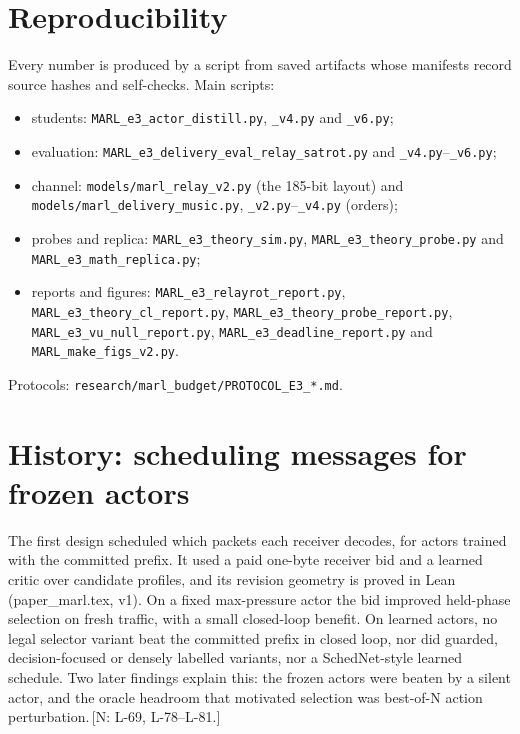 \documentclass[11pt]{article}
\theoremstyle{definition}
\newif\ifshownotes\shownotestrue
\newcommand{\NOTE}[1]{\ifshownotes{\color{notecol}\,\textsf{\footnotesize[N: #1]}}\fi}
\begin{document}
\section*{Reproducibility}
Every number is produced by a script from saved artifacts whose manifests record source hashes and self-checks. Main
scripts:
\begin{itemize}
\item students: \texttt{MARL\_e3\_actor\_distill.py}, \texttt{\_v4.py} and \texttt{\_v6.py};
\item evaluation: \texttt{MARL\_e3\_delivery\_eval\_relay\_satrot.py} and \texttt{\_v4.py}--\texttt{\_v6.py};
\item channel: \texttt{models/marl\_relay\_v2.py} (the 185-bit layout) and \texttt{models/marl\_delivery\_music.py},
\texttt{\_v2.py}--\texttt{\_v4.py} (orders);
\item probes and replica: \texttt{MARL\_e3\_theory\_sim.py}, \texttt{MARL\_e3\_theory\_probe.py} and
\texttt{MARL\_e3\_math\_replica.py};
\item reports and figures: \texttt{MARL\_e3\_relayrot\_report.py}, \texttt{MARL\_e3\_theory\_cl\_report.py},
\texttt{MARL\_e3\_theory\_probe\_report.py}, \texttt{MARL\_e3\_vu\_null\_report.py}, \texttt{MARL\_e3\_deadline\_report.py} and
\texttt{MARL\_make\_figs\_v2.py}.
\end{itemize}
Protocols: \texttt{research/marl\_budget/PROTOCOL\_E3\_*.md}.

\appendix
\section{History: scheduling messages for frozen actors}\label{app:history}
The first design scheduled which packets each receiver decodes, for actors trained with the committed prefix. It used a
paid one-byte receiver bid and a learned critic over candidate profiles, and its revision geometry is proved in Lean
(paper\_marl.tex, v1). On a fixed max-pressure actor the bid improved held-phase selection on fresh traffic, with a small
closed-loop benefit. On learned actors, no legal selector variant beat the committed prefix in closed loop, nor did
guarded, decision-focused or densely labelled variants, nor a SchedNet-style learned schedule. Two later findings explain
this: the frozen actors were beaten by a silent actor, and the oracle headroom that motivated selection was best-of-N
action perturbation.\NOTE{L-69, L-78--L-81.}
\end{document}
